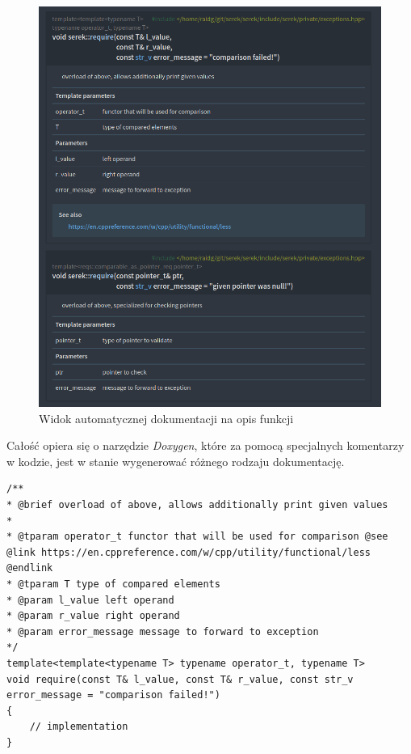 \documentclass[12pt]{article}
\newcommand{\n}{\newline}
\begin{document}
{{{				\begin{figure}[H]
					\centering
					\includegraphics[width=15cm,keepaspectratio=true]{./img/documentation_part_2.png}
					\caption*{Widok automatycznej dokumentacji na opis funkcji}
					\medskip
				\end{figure}

				\newpage

				Całość opiera się o narzędzie {\it Doxygen}, które za pomocą specjalnych komentarzy w kodzie, jest w stanie wygenerować różnego rodzaju dokumentację.\n

				\begin{lstlisting}[frame=single]
/**
* @brief overload of above, allows additionally print given values
*
* @tparam operator_t functor that will be used for comparison @see @link https://en.cppreference.com/w/cpp/utility/functional/less @endlink
* @tparam T type of compared elements
* @param l_value left operand
* @param r_value right operand
* @param error_message message to forward to exception
*/
template<template<typename T> typename operator_t, typename T>
void require(const T& l_value, const T& r_value, const str_v error_message = "comparison failed!")
{
	// implementation
}


\end{lstlisting}}}}
\end{document}
